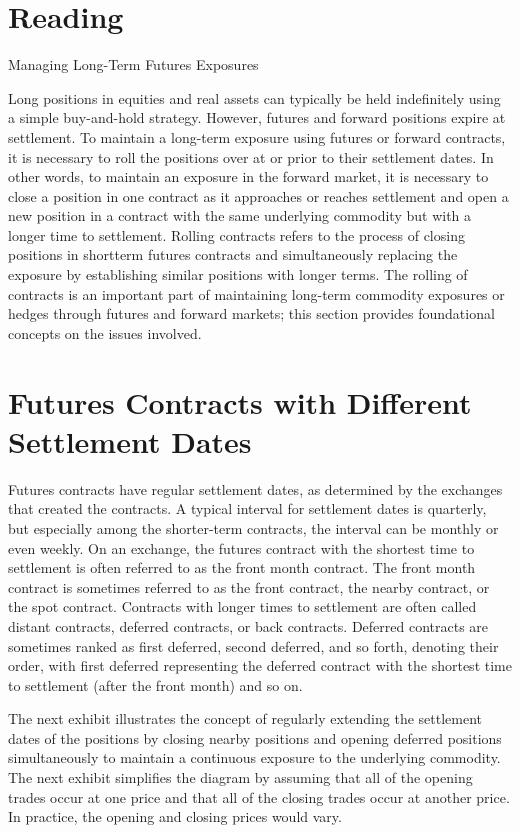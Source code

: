 \documentclass[11pt]{article}
\begin{document}
\section*{Reading}
Managing Long-Term Futures Exposures

Long positions in equities and real assets can typically be held indefinitely using a simple buy-and-hold strategy. However, futures and forward positions expire at settlement. To maintain a long-term exposure using futures or forward contracts, it is necessary to roll the positions over at or prior to their settlement dates. In other words, to maintain an exposure in the forward market, it is necessary to close a position in one contract as it approaches or reaches settlement and open a new position in a contract with the same underlying commodity but with a longer time to settlement. Rolling contracts refers to the process of closing positions in shortterm futures contracts and simultaneously replacing the exposure by establishing similar positions with longer terms. The rolling of contracts is an important part of maintaining long-term commodity exposures or hedges through futures and forward markets; this section provides foundational concepts on the issues involved.

\section*{Futures Contracts with Different Settlement Dates}
Futures contracts have regular settlement dates, as determined by the exchanges that created the contracts. A typical interval for settlement dates is quarterly, but especially among the shorter-term contracts, the interval can be monthly or even weekly. On an exchange, the futures contract with the shortest time to settlement is often referred to as the front month contract. The front month contract is sometimes referred to as the front contract, the nearby contract, or the spot contract. Contracts with longer times to settlement are often called distant contracts, deferred contracts, or back contracts. Deferred contracts are sometimes ranked as first deferred, second deferred, and so forth, denoting their order, with first deferred representing the deferred contract with the shortest time to settlement (after the front month) and so on.

The next exhibit illustrates the concept of regularly extending the settlement dates of the positions by closing nearby positions and opening deferred positions simultaneously to maintain a continuous exposure to the underlying commodity. The next exhibit simplifies the diagram by assuming that all of the opening trades occur at one price and that all of the closing trades occur at another price. In practice, the opening and closing prices would vary.
\end{document}
